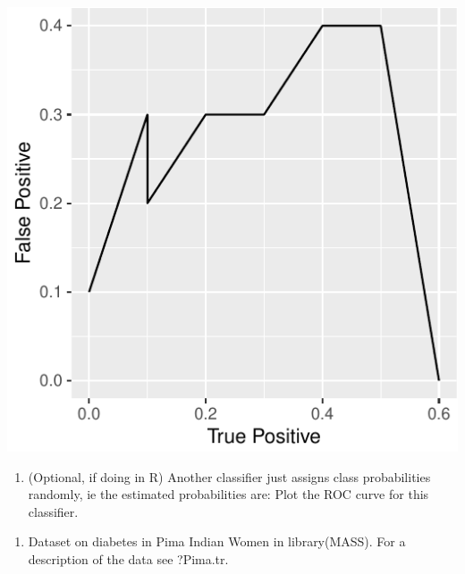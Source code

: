 \documentclass[]{article}
\newenvironment{Shaded}{\begin{snugshade}}{\end{snugshade}}
\newcommand{\DataTypeTok}[1]{\textcolor[rgb]{0.13,0.29,0.53}{#1}}
\newcommand{\KeywordTok}[1]{\textcolor[rgb]{0.13,0.29,0.53}{\textbf{#1}}}
\newcommand{\NormalTok}[1]{#1}
\newcommand{\OperatorTok}[1]{\textcolor[rgb]{0.81,0.36,0.00}{\textbf{#1}}}
\newcommand{\StringTok}[1]{\textcolor[rgb]{0.31,0.60,0.02}{#1}}
\providecommand{\tightlist}{%
  \setlength{\itemsep}{0pt}\setlength{\parskip}{0pt}}
\begin{document}
\begin{Shaded}
\end{Shaded}

\begin{center}\includegraphics{sol_A3_files/figure-latex/unnamed-chunk-20-1} \end{center}

\begin{enumerate}
\def\labelenumi{(\alph{enumi})}
\setcounter{enumi}{4}
\tightlist
\item
  (Optional, if doing in R) Another classifier just assigns class
  probabilities randomly, ie the estimated probabilities are: Plot the
  ROC curve for this classifier.
\end{enumerate}

\begin{enumerate}
\def\labelenumi{\arabic{enumi}.}
\setcounter{enumi}{4}
\tightlist
\item
  Dataset on diabetes in Pima Indian Women in library(MASS). For a
  description of the data see ?Pima.tr.
\end{enumerate}
\end{document}

